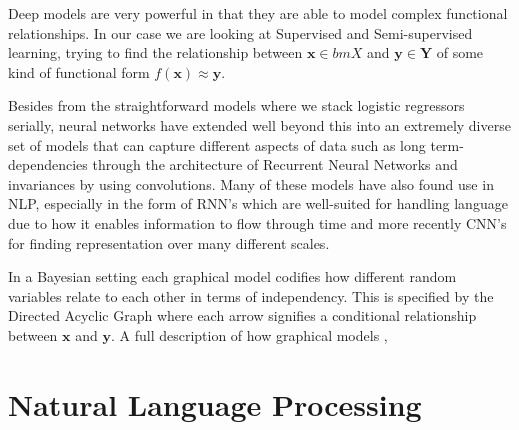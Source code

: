 Deep models are very powerful in that they are able to model complex functional
relationships. In our case we are looking at Supervised and Semi-supervised
learning, trying to find the relationship between $\bm{x} \in bm{X}$ and $\bm{y}
\in \bm{Y}$ of some kind of functional form $f(\bm{x}) \approx \bm{y}$.

Besides from the straightforward models where we stack logistic regressors
serially, neural networks have extended well beyond this into an extremely
diverse set of models that can capture different aspects of data such as long
term-dependencies through the architecture of Recurrent Neural Networks and
invariances by using convolutions. Many of these models have also found use in
NLP, especially in the form of RNN's which are well-suited for handling
language due to how it enables information to flow through
time\cite{graves_generating_2013}\cite{cho_learning_2014} and more recently
CNN's for finding representation over many different
scales\cite{semeniuta_hybrid_2017}\cite{yang_improved_2017}\cite{gehring_convolutional_2016}.

In a Bayesian setting each graphical model codifies how different random variables relate
to each other in terms of independency. This is specified by the Directed
Acyclic Graph where each arrow signifies a conditional relationship between
$\bm{x}$ and $\bm{y}$. A full description of how graphical models ,

\section{Natural Language Processing}



